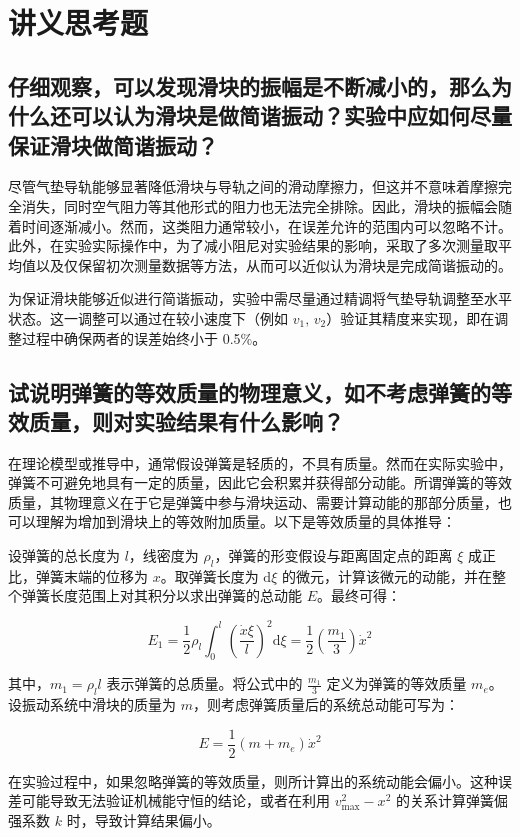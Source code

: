 \documentclass[UTF-8,twoside,cs4size]{ctexart}
\newcommand{\dif}{\mathrm{d}}
\begin{document}
\section{讲义思考题}
\subsection{仔细观察，可以发现滑块的振幅是不断减小的，那么为什么还可以认为滑块是做简谐振动？实验中应如何尽量保证滑块做简谐振动？}
{\kaishu 尽管气垫导轨能够显著降低滑块与导轨之间的滑动摩擦力，但这并不意味着摩擦完全消失，同时空气阻力等其他形式的阻力也无法完全排除。因此，滑块的振幅会随着时间逐渐减小。然而，这类阻力通常较小，在误差允许的范围内可以忽略不计。此外，在实验实际操作中，为了减小阻尼对实验结果的影响，采取了多次测量取平均值以及仅保留初次测量数据等方法，从而可以近似认为滑块是完成简谐振动的。}

{\kaishu 为保证滑块能够近似进行简谐振动，实验中需尽量通过精调将气垫导轨调整至水平状态。这一调整可以通过在较小速度下（例如 $v_1,\,v_2$）验证其精度来实现，即在调整过程中确保两者的误差始终小于 0.5\%。}

\subsection{试说明弹簧的等效质量的物理意义，如不考虑弹簧的等效质量，则对实验结果有什么影响？}
{\kaishu 在理论模型或推导中，通常假设弹簧是轻质的，不具有质量。然而在实际实验中，弹簧不可避免地具有一定的质量，因此它会积累并获得部分动能。所谓弹簧的等效质量，其物理意义在于它是弹簧中参与滑块运动、需要计算动能的那部分质量，也可以理解为增加到滑块上的等效附加质量。以下是等效质量的具体推导：}

{\kaishu 设弹簧的总长度为 $l$，线密度为 $\rho_l$，弹簧的形变假设与距离固定点的距离 $\xi$ 成正比，弹簧末端的位移为 $x$。取弹簧长度为 $\dif\xi$ 的微元，计算该微元的动能，并在整个弹簧长度范围上对其积分以求出弹簧的总动能 $E$。最终可得：}

\[
E_1 = \frac{1}{2}\rho_l\int_0^l\left(\frac{\dot{x}\xi}{l}\right)^2 \dif\xi = \frac{1}{2}\left(\frac{m_1}{3}\right)\dot{x}^2
\]

{\kaishu 其中，$m_1 = \rho_l l$ 表示弹簧的总质量。将公式中的 $\frac{m_1}{3}$ 定义为弹簧的等效质量 $m_e$。设振动系统中滑块的质量为 $m$，则考虑弹簧质量后的系统总动能可写为：}

\[
E = \frac{1}{2}(m + m_e)\dot{x}^2
\]

{\kaishu 在实验过程中，如果忽略弹簧的等效质量，则所计算出的系统动能会偏小。这种误差可能导致无法验证机械能守恒的结论，或者在利用 $v_\max^2 - x^2$ 的关系计算弹簧倔强系数 $k$ 时，导致计算结果偏小。}
\end{document}
